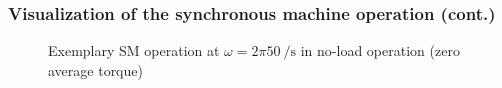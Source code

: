 \begin{frame}
	\frametitle{Visualization of the synchronous machine operation (cont.)}
    \vspace{-0.275cm}
    \begin{figure}
        \centering
        \vspace{-0.25cm}
        \caption{Exemplary SM operation at $\omega=2 \pi \SI{50}{\per\second}$ in no-load operation (zero average torque)}
        \label{fig:SM_load_angle_0_animation}
    \end{figure}
\end{frame}